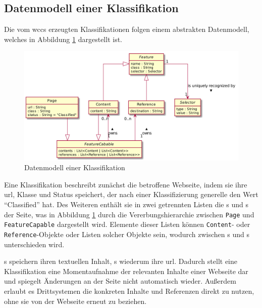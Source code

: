 
    \subsection{Datenmodell einer Klassifikation}
        \label{section:conceptPageDataModel}
        Die vom \gls{wccs} erzeugten Klassifikationen folgen einem abstrakten Datenmodell,
        welches in Abbildung \ref{image:conceptPageDataModel} dargestellt ist.

        \begin{figure}[htb]
            \centering
            \includegraphics[scale=\imageScalingFactor]{../resources/concept/page.png}
            \caption{Datenmodell einer Klassifikation}
            \label{image:conceptPageDataModel}
        \end{figure}

        Eine Klassifikation beschreibt zunächst die betroffene Webseite,
        indem sie ihre \gls{url}, Klasse und Status speichert,
        der nach einer Klassifizierung generelle den Wert "`Classified"' hat.       
        Des Weiteren enthält sie in zwei getrennten Listen die {\contentFeature}s
        und {}s der Seite, was in Abbildung \ref{image:conceptPageDataModel}
        durch die Vererbungshierarchie zwischen \texttt{Page} und \texttt{FeatureCapable}
        dargestellt wird.
        Elemente dieser Listen können \texttt{Content}- oder \texttt{Reference}-Objekte
        oder Listen solcher Objekte sein,
        wodurch zwischen {\scalarFeature}s und {\collectionFeature}s unterschieden wird.

        {\contentFeature}s speichern ihren textuellen Inhalt,
        {}s wiederum ihre \gls{url}.
        Dadurch stellt eine Klassifikation eine Momentaufnahme der relevanten Inhalte
        einer Webseite dar und spiegelt Änderungen an der Seite nicht
        automatisch wieder.
        Außerdem erlaubt es Drittsystemen die konkreten Inhalte und Referenzen
        direkt zu nutzen, ohne sie von der Webseite erneut zu beziehen.
        
